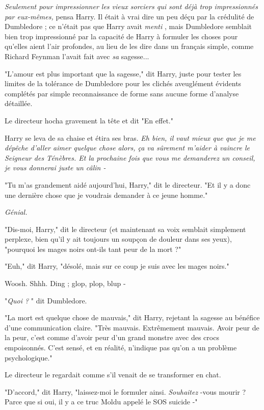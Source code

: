 \emph{Seulement pour impressionner les vieux sorciers qui sont déjà trop impressionnés par eux-mêmes, } pensa Harry. Il était à vrai dire un peu déçu par la crédulité de Dumbledore ; ce n'était pas que Harry avait \emph{menti} , mais Dumbledore semblait bien trop impressionné par la capacité de Harry à formuler les choses pour qu'elles aient l'air profondes, au lieu de les dire dans un français simple, comme Richard Feynman l'avait fait avec \emph{sa}  sagesse...

"L'amour est plus important que la sagesse," dit Harry, juste pour tester les limites de la tolérance de Dumbledore pour les clichés aveuglément évidents complétés par simple reconnaissance de forme sans aucune forme d'analyse détaillée.

Le directeur hocha gravement la tête et dit "En effet."

Harry se leva de sa chaise et étira ses bras. \emph{Eh bien, il vaut mieux que que je me dépêche d'aller aimer quelque chose alors, ça va sûrement m'aider à vaincre le Seigneur des Ténèbres. Et la prochaine fois que vous me demanderez un conseil, je vous donnerai juste un câlin -} 

"Tu m'as grandement aidé aujourd'hui, Harry," dit le directeur. "Et il y a donc une dernière chose que je voudrais demander à ce jeune homme."

\emph{Génial.} 

"Dis-moi, Harry," dit le directeur (et maintenant sa voix semblait simplement perplexe, bien qu'il y ait toujours un soupçon de douleur dans ses yeux), "pourquoi les mages noirs ont-ils tant peur de la mort ?"

"Euh," dit Harry, "désolé, mais sur ce coup je suis avec les mages noirs."

Woosh. Shhh. Ding ; glop, plop, blup -

"\emph{Quoi ?} " dit Dumbledore.

"La mort est quelque chose de mauvais," dit Harry, rejetant la sagesse au bénéfice d'une communication claire. "Très mauvais. Extrêmement mauvais. Avoir peur de la peur, c'est comme d'avoir peur d'un grand monstre avec des crocs empoisonnés. C'est sensé, et en réalité, n'indique pas qu'on a un problème psychologique."

Le directeur le regardait comme s'il venait de se transformer en chat.

"D'accord," dit Harry, "laissez-moi le formuler ainsi. \emph{Souhaitez} -vous mourir ? Parce que si oui, il y a ce truc Moldu appelé le SOS suicide -"

